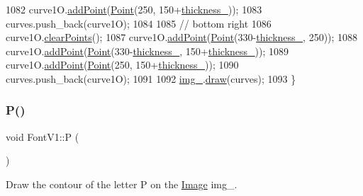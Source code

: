 \begin{DoxyCode}
1082     curve1O.\mbox{\hyperlink{class_bezier_curve_a38d16c18b36ae45619b05e26e226cf34}{addPoint}}(\mbox{\hyperlink{class_point}{Point}}(250, 150+\mbox{\hyperlink{class_font_v1_aed8040e76be9a52833627b92f0fb4e5f}{thickness\_}}));
1083     curves.push\_back(curve1O);
1084 
1085     \textcolor{comment}{// bottom right}
1086     curve1O.\mbox{\hyperlink{class_bezier_curve_a0ba8ce66d5af5971ae6a1b506029728e}{clearPoints}}();
1087     curve1O.\mbox{\hyperlink{class_bezier_curve_a38d16c18b36ae45619b05e26e226cf34}{addPoint}}(\mbox{\hyperlink{class_point}{Point}}(330-\mbox{\hyperlink{class_font_v1_aed8040e76be9a52833627b92f0fb4e5f}{thickness\_}}, 250));
1088     curve1O.\mbox{\hyperlink{class_bezier_curve_a38d16c18b36ae45619b05e26e226cf34}{addPoint}}(\mbox{\hyperlink{class_point}{Point}}(330-\mbox{\hyperlink{class_font_v1_aed8040e76be9a52833627b92f0fb4e5f}{thickness\_}}, 150+\mbox{\hyperlink{class_font_v1_aed8040e76be9a52833627b92f0fb4e5f}{thickness\_}}));
1089     curve1O.\mbox{\hyperlink{class_bezier_curve_a38d16c18b36ae45619b05e26e226cf34}{addPoint}}(\mbox{\hyperlink{class_point}{Point}}(250, 150+\mbox{\hyperlink{class_font_v1_aed8040e76be9a52833627b92f0fb4e5f}{thickness\_}}));
1090     curves.push\_back(curve1O);
1091 
1092     \mbox{\hyperlink{class_font_v1_a00569e3e3c4b70f437b63f396f735fb0}{img\_}}.\mbox{\hyperlink{class_image_a8d162f3cab956131d58708c09aa560b0}{draw}}(curves);
1093 \}
\end{DoxyCode}
\mbox{\label{class_font_v1_aeaf56ebe48a78aedf53626f50f10ee4d}} 
\subsubsection{\texorpdfstring{P()}{P()}}
{\footnotesize\ttfamily void Font\+V1\+::P (\begin{DoxyParamCaption}{ }\end{DoxyParamCaption})}



Draw the contour of the letter P on the \mbox{\hyperlink{class_image}{Image}} img\+\_\+. 



